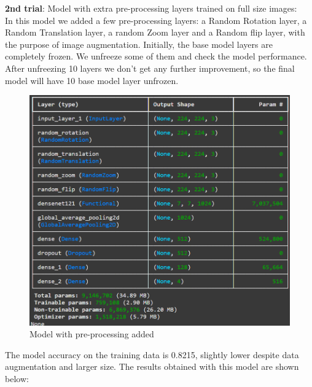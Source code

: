 \documentclass{article}
\begin{document}
\textbf{2nd trial}: Model with extra pre-processing layers trained on full size images:\\
In this model we added a few pre-processing layers: a Random Rotation layer, a Random Translation layer, a random Zoom layer and a Random flip layer, with the purpose of image augmentation.
Initially, the base model layers are completely frozen. We unfreeze some of them and check the model performance. After unfreezing 10 layers we don't get any further improvement, so the final model will have 10 base model layer unfrozen. 

 \begin{figure}[H]
    \centering
    \includegraphics[width=0.8\linewidth]{DN121arch1.png}
    \caption{Model with pre-processing added}
    \label{fig:DN121arch1}
\end{figure}

The model accuracy on the training data is 0.8215, slightly lower despite data augmentation and larger size. The results obtained with this model are shown below:
\end{document}
